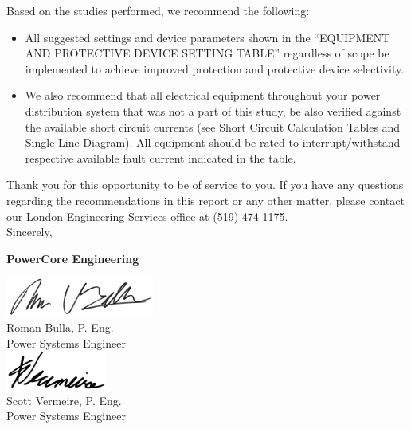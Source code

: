 Based on the studies performed, we recommend the following:
\begin{itemize}
	\item All suggested settings and device parameters shown in the “EQUIPMENT AND PROTECTIVE DEVICE SETTING TABLE” regardless of scope be implemented to achieve improved protection and protective device selectivity.
	\item We also recommend that all electrical equipment throughout your power distribution system that was not a part of this study, be also verified against the available short circuit currents (see Short Circuit Calculation Tables and Single Line Diagram). All equipment should be rated to interrupt/withstand respective
available fault current indicated in the table.
\end{itemize}

\vspace{10mm}
\noindent Thank you for this opportunity to be of service to you.  If you have any questions regarding the recommendations in this report or any other matter, please contact our London Engineering Services office at (519) 474-1175. \newline
\vspace{5mm}
\\
\noindent Sincerely,\newline

\vspace{5mm}
\noindent\textbf{PowerCore Engineering}\newline

\begin{multicols}{2}
\centering
\includegraphics[height=0.5in, keepaspectratio=true]{../Images/Roman_signature.jpg} \\
Roman Bulla, P. Eng. \\Power Systems Engineer \\
\includegraphics[height=0.5in, keepaspectratio=true]{../Images/Scott_signature.jpg} \\
Scott Vermeire, P. Eng. \\Power Systems Engineer \\
\end{multicols}


